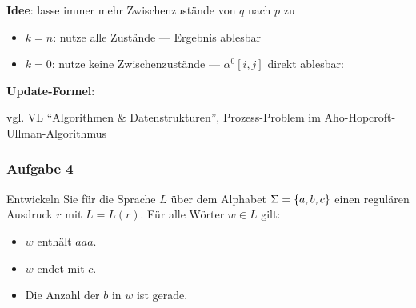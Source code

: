 \documentclass{beamer}
\begin{document}
	\begin{frame}
		\small
		\textbf{Idee}: lasse immer mehr Zwischenzustände von $q$ nach $p$ zu \\
		\begin{itemize}
			\item $k = n$: nutze alle Zustände --- Ergebnis ablesbar
			\item $k = 0$: nutze keine Zwischenzustände --- $\alpha^0[i,j]$ direkt ablesbar:
		\end{itemize}
	
		\textbf{Update-Formel}:
	
		\begin{itshape}
			\scriptsize
			vgl. VL \enquote{Algorithmen \& Datenstrukturen}, Prozess-Problem im Aho-Hopcroft-Ullman-Algorithmus
		\end{itshape}
	\end{frame}

	\begin{frame} \frametitle{Aufgabe 4}
		\small
		Entwickeln Sie für die Sprache $L$ über dem Alphabet $\Sigma = \left\{ a, b, c \right\}$ einen regulären Ausdruck $r$ mit $L = L(r)$. Für alle Wörter $w \in L$ gilt:
		\begin{itemize}
			\item $w$ enthält $aaa$.
			\item $w$ endet mit $c$.
			\item Die Anzahl der $b$ in $w$ ist gerade.
		\end{itemize}
	\end{frame}
	
\end{document}
